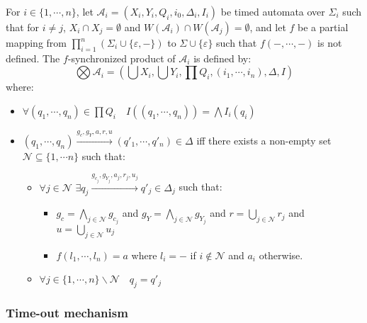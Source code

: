 \documentclass[a4paper,10pt]{article}
\def\A{\ensuremath{\mathcal{A}}}
\def\N{\ensuremath{\mathcal{N}}}
\begin{document}
For $i \in \{ 1, \cdots , n \}$, let $\A_i = (X_i,Y_i,Q_i,i_0,\Delta_i,I_i)$ be timed automata over
$\Sigma_i$ such that for $i \neq j$, $X_i \cap X_j = \emptyset$ and
$W(\A_i) \cap W(\A_j) = \emptyset$, and
let $f$ be a partial mapping from
$\prod_{i=1}^{n} (\Sigma_i \cup \{ \varepsilon , - \})$ to
$\Sigma \cup \{ \varepsilon \}$ such that $f(-, \cdots , -)$ is not
defined. The $f$-synchronized product of $\A_i$ is defined by:
\[
\bigotimes \A_i = \left (
\bigcup X_i , \bigcup Y_i , \prod Q_i , (i_1,\cdots , i_n) , \Delta, I
\right )
\]
where:
\begin{itemize}
\item $\forall (q_1,\cdots , q_n) \in \prod Q_i \quad I((q_1,\cdots ,
  q_n)) = \bigwedge I_i(q_i)$
\item $(q_1,\cdots , q_n)  \xrightarrow{g_c,g_Y,a,r,u} (q'_1,\cdots ,
  q'_n) \in \Delta$ iff there exists a non-empty set $\N 
  \subseteq \{ 1 , \cdots n \}$ such that:
\begin{itemize}
\item $\forall j \in \N \, \, \exists q_j
  \xrightarrow{g_{c_j},g_{Y_j},a_j,r_j,u_j} q'_j \in \Delta_j$ such
  that:
\begin{itemize}
\item $g_c = \bigwedge\limits_{j \in \N} g_{c_j}$ and $g_Y = \bigwedge\limits_{j \in
    \N} g_{Y_j}$ and $r = \bigcup\limits_{j \in \N} r_j$ and $u = \bigcup\limits_{j \in \N} u_j$
\item $f(l_1,\cdots,l_n) = a$ where $l_i = -$ if $i \not \in \N$ and
  $a_i$ otherwise.
\end{itemize}
\item $\forall j \in \{ 1 , \cdots , n \} \backslash \N \quad q_j =
  q'_j$
\end{itemize}
\end{itemize}

\subsubsection*{Time-out mechanism}
\end{document}

